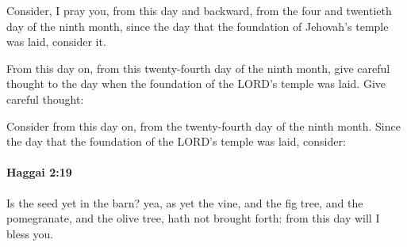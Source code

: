 			\begin{versebox}
					\item[BHS] 
					\item[LXX] 
					\item[ASV] Consider, I pray you, from this day and backward, from the four and twentieth day of the ninth month, since the day that the foundation of Jehovah's temple was laid, consider it.
					\item[NIV] From this day on, from this twenty-fourth day of the ninth month, give careful thought to the day when the foundation of the LORD’s temple was laid. Give careful thought:
					\item[NRSV] Consider from this day on, from the twenty-fourth day of the ninth month. Since the day that the foundation of the LORD’s temple was laid, consider:
			\end{versebox}

		\paragraph{Haggai 2:19} %
			\label{HAGGAI-2-19}

			Is the seed yet in the barn? yea, as yet the vine, and the fig tree, and the pomegranate, and the olive tree, hath not brought forth: from this day will I bless you.

